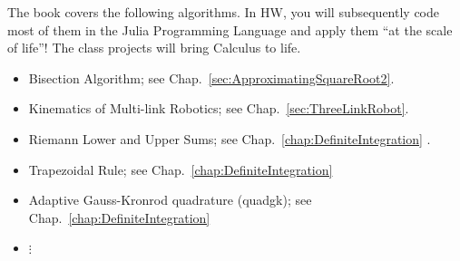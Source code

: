 
The book covers the following algorithms. In HW, you will subsequently code most of them in the Julia Programming Language and apply them ``at the scale of life''! The class projects will bring Calculus to life.

\begin{itemize}
    \item Bisection Algorithm; see Chap.~\ref{sec:ApproximatingSquareRoot2}.
    \item Kinematics of Multi-link Robotics; see Chap.~\ref{sec:ThreeLinkRobot}.
    \item Riemann Lower and Upper Sums; see Chap.~\ref{chap:DefiniteIntegration} .
    \item Trapezoidal Rule;  see Chap.~\ref{chap:DefiniteIntegration}
    \item Adaptive Gauss-Kronrod quadrature (quadgk);  see Chap.~\ref{chap:DefiniteIntegration}
    \item $\vdots$
\end{itemize}